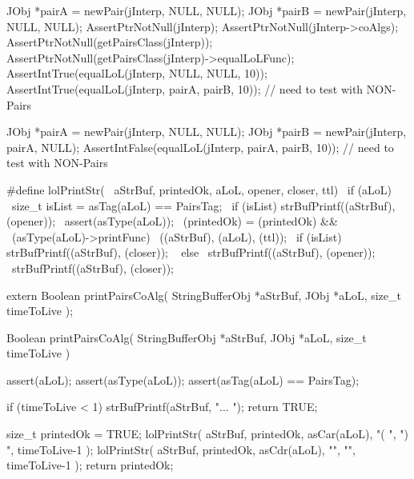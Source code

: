 \startCTest
  JObj *pairA = newPair(jInterp, NULL, NULL);
  JObj *pairB = newPair(jInterp, NULL, NULL);
  AssertPtrNotNull(jInterp);
  AssertPtrNotNull(jInterp->coAlgs);
  AssertPtrNotNull(getPairsClass(jInterp));
  AssertPtrNotNull(getPairsClass(jInterp)->equalLoLFunc);
  AssertIntTrue(equalLoL(jInterp, NULL, NULL, 10));
  AssertIntTrue(equalLoL(jInterp, pairA, pairB, 10));
  // need to test with NON-Pairs
\stopCTest
\stopTestCase

\startCTest
  JObj *pairA = newPair(jInterp, NULL,  NULL);
  JObj *pairB = newPair(jInterp, pairA, NULL);
  AssertIntFalse(equalLoL(jInterp, pairA, pairB, 10));
  // need to test with NON-Pairs
\stopCTest
\stopTestCase
\stopTestSuite


\startCHeader
#define lolPrintStr(                                \
  aStrBuf, printedOk, aLoL, opener, closer, ttl)    \
  if (aLoL) {								                        \
    size_t isList = asTag(aLoL) == PairsTag;        \
    if (isList) strBufPrintf((aStrBuf), (opener));  \
    assert(asType(aLoL));						                \
    (printedOk) = (printedOk) && 						        \
      (asType(aLoL)->printFunc)                     \
        ((aStrBuf), (aLoL), (ttl));                 \
    if (isList) strBufPrintf((aStrBuf), (closer));  \
  } else {								                          \
    strBufPrintf((aStrBuf), (opener));						  \
    strBufPrintf((aStrBuf), (closer));						  \
  }
\stopCHeader

\setCHeaderStream{private}
\startCHeader
extern Boolean printPairsCoAlg(
  StringBufferObj *aStrBuf,
  JObj            *aLoL,
  size_t           timeToLive
);
\stopCHeader
\setCHeaderStream{public}

\startCCode
Boolean printPairsCoAlg(
  StringBufferObj *aStrBuf,
  JObj            *aLoL,
  size_t           timeToLive
) {
  assert(aLoL);
  assert(asType(aLoL));
  assert(asTag(aLoL) == PairsTag);

  if (timeToLive < 1) {
    strBufPrintf(aStrBuf, "... ");
    return TRUE;
  }
  
  size_t printedOk = TRUE;
  lolPrintStr(
    aStrBuf,
    printedOk,
    asCar(aLoL),
    "( ", ") ",
    timeToLive-1
  );
  lolPrintStr(
    aStrBuf,
    printedOk,
    asCdr(aLoL),
    "",   "",
    timeToLive-1
  );
  return printedOk;
}
\stopCCode


